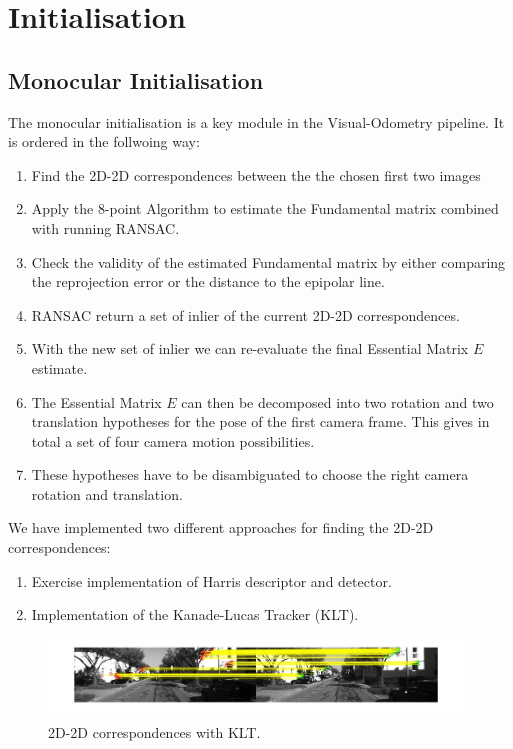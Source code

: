 \section{Initialisation}
\label{s:Initialisation}

\subsection{Monocular Initialisation}
The monocular initialisation is a key module in the Visual-Odometry pipeline.
It is ordered in the follwoing way:
\begin{enumerate}
	\item Find the 2D-2D correspondences between the the chosen first two images
	\item Apply the 8-point Algorithm to estimate the Fundamental matrix combined with running RANSAC.
	\item Check the validity of the estimated Fundamental matrix by either comparing the reprojection error or the distance to the epipolar line. 
	\item RANSAC return a set of inlier of the current 2D-2D correspondences.
	\item With the new set of inlier we can re-evaluate the final Essential Matrix $E$ estimate.
	\item The Essential Matrix $E$ can then be decomposed into two rotation and two translation hypotheses for the pose of the first camera frame. This gives in total a set of four camera motion possibilities.
	\item These hypotheses have to be disambiguated to choose the right camera rotation and translation.
\end{enumerate}

We have implemented two different approaches for finding the 2D-2D correspondences:

\begin{enumerate}
	\item Exercise implementation of Harris descriptor and detector.
	\item Implementation of the Kanade-Lucas Tracker (KLT).
\end{enumerate}

\begin{figure}
\includegraphics[width=0.98\textwidth]{files/KLT_2d2d.jpg}
\caption[\label{s:KLT_2d2d}]{2D-2D correspondences with KLT.}
\end{figure}

